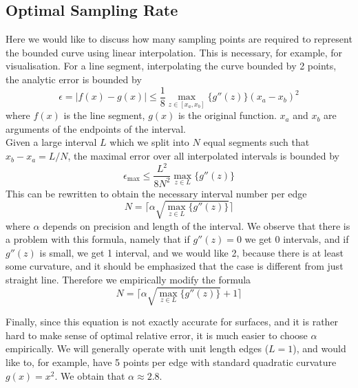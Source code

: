 \documentclass[12pt]{article}
\begin{document}
\subsection{Optimal Sampling Rate}

Here we would like to discuss how many sampling points are required to represent the bounded curve using linear interpolation. This is necessary, for example, for visualisation. For a line segment, interpolating the curve bounded by 2 points, the analytic error is bounded by
\begin{equation}
	\epsilon = |f(x) - g(x)| \leq \frac{1}{8} \max_{z \in [x_a, x_b]} \{ g''(z)  \} (x_a - x_b)^2
\end{equation}
\noindent
where $f(x)$ is the line segment, $g(x)$ is the original function. $x_a$ and $x_b$ are arguments of the endpoints of the interval. \\

\noindent
Given a large interval $L$ which we split into $N$ equal segments such that $x_b - x_a = L/N$, the maximal error over all interpolated intervals is bounded by
\begin{equation}
	\epsilon_{\max} \leq \frac{L^2}{8 N^2} \max_{z \in L} \{ g''(z) \}
\end{equation}
\noindent
This can be rewritten to obtain the necessary interval number per edge
\begin{equation}
	N = \biggl \lceil \alpha \sqrt{ \max_{z \in L} \{ g''(z) \} } \biggr \rceil
\end{equation}
\noindent
where $\alpha$ depends on precision and length of the interval. We observe that there is a problem with this formula, namely that if $g''(z) = 0$ we get 0 intervals, and if $g''(z)$ is small, we get 1 interval, and we would like 2, because there is at least some curvature, and it should be emphasized that the case is different from just straight line. Therefore we empirically modify the formula
\begin{equation}
	N = \biggl \lceil \alpha \sqrt{ \max_{z \in L} \{ g''(z) \} } + 1 \biggr \rceil
\end{equation}

\noindent
Finally, since this equation is not exactly accurate for surfaces, and it is rather hard to make sense of optimal relative error, it is much easier to choose $\alpha$ empirically. We will generally operate with unit length edges ($L = 1$), and would like to, for example, have 5 points per edge with standard quadratic curvature $g(x) = x^2$. We obtain that $\alpha \approx 2.8$. \\
\end{document}
